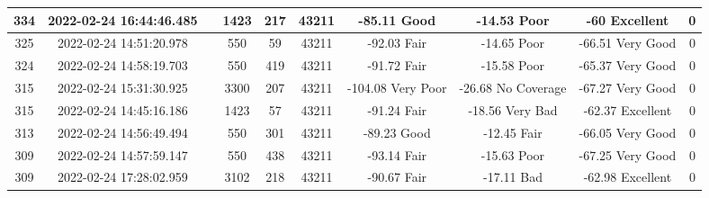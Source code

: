 \begin{longtable*}{|c|c|c|c|c|c|c|c|c|c|}
334&2022-02-24 16:44:46.485&&1423&217&43211& -85.11    Good        & -14.53    Poor        & -60       Excellent   & 0\\\hline
{}325&2022-02-24 14:51:20.978&&550&59&43211& -92.03    Fair        & -14.65    Poor        & -66.51    Very Good   & 0\\\hline
{}324&2022-02-24 14:58:19.703&&550&419&43211& -91.72    Fair        & -15.58    Poor        & -65.37    Very Good   & 0\\\hline
{}315&2022-02-24 15:31:30.925&&3300&207&43211& -104.08   Very Poor   & -26.68    No Coverage & -67.27    Very Good   & 0\\\hline
{}315&2022-02-24 14:45:16.186&&1423&57&43211& -91.24    Fair        & -18.56    Very Bad    & -62.37    Excellent   & 0\\\hline
{}313&2022-02-24 14:56:49.494&&550&301&43211& -89.23    Good        & -12.45    Fair        & -66.05    Very Good   & 0\\\hline
{}309&2022-02-24 14:57:59.147&&550&438&43211& -93.14    Fair        & -15.63    Poor        & -67.25    Very Good   & 0\\\hline
{}309&2022-02-24 17:28:02.959&&3102&218&43211& -90.67    Fair        & -17.11    Bad         & -62.98    Excellent   & 0\\\hline

\end{longtable*}
